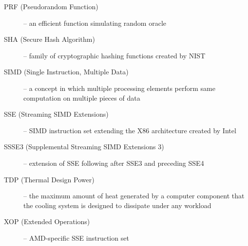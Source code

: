 \documentclass[nolof,digital]{fithesis3}
\begin{document}
\begin{description}
\item[PRF (Pseudorandom Function)] -- an efficient function simulating random oracle

\item[SHA (Secure Hash Algorithm)] -- family of cryptographic hashing functions created by NIST

\item[SIMD (Single Instruction, Multiple Data)] -- a concept in which multiple processing elements perform same computation on multiple pieces of data

\item[SSE (Streaming SIMD Extensions)] -- SIMD instruction set extending the X86 architecture created by Intel

\item[SSSE3 (Supplemental Streaming SIMD Extensions 3)] -- extension of SSE following after SSE3 and preceding SSE4

\item[TDP (Thermal Design Power)] -- the maximum amount of heat generated by a computer component that the cooling system is designed to dissipate under any workload

\item[XOP (Extended Operations)] -- AMD-specific SSE instruction set
\end{description}
\end{document}
